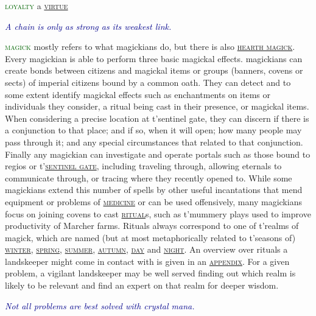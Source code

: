 \documentclass[twoside,11pt,b5paper,twocolumn]{scrbook}
\newcommand{\estcab}[1]{\textsc{\textcolor{marron}{#1}}}
\newcommand{\keyword}[1]{\textcolor{darkgreen}{#1}}
\renewcommand{\paragraph}[1]{\par\noindent\markboth{#1}{#1}\estcab{\keyword{#1}}\label{#1} }
\newcommand{\see}[1]{{\estcab{\hyperref[#1]{#1}}}}
\newcommand{\proverb}[1]{\par \textcolor{darkblue}{\itshape #1}}
\begin{document}
\paragraph{loyalty} a \see{virtue} \proverb{A chain is only as strong as its weakest link.}
\paragraph{magick} mostly refers to what magickians do, but there is also \see{hearth magick}. Every magickian is able to perform three basic magickal effects. magickians can create bonds between citizens and magickal items or groups (banners, covens or sects) of imperial citizens bound by a common oath. They can detect and to some extent identify magickal effects such as enchantments on items or individuals they consider, a ritual being cast in their presence, or magickal items. When considering a precise location at t'sentinel gate, they can discern if there is a conjunction to that place; and if so, when it will open; how many people may pass through it; and any special circumstances that related to that conjunction. Finally any magickian can investigate and operate portals such as those bound to regios or t'\see{sentinel gate}, including traveling through, allowing eternals to communicate through, or tracing where they recently opened to. While some magickians extend this number of spells by other useful incantations that mend equipment or problems of \see{medicine} or can be used offensively, many magickians focus on joining covens to cast \see{ritual}s, such as t'mummery plays used to improve productivity of Marcher farms. Rituals always correspond to one of t'realms of magick, which are named (but at most metaphorically related to t'seasons of) \see{winter}, \see{spring}, \see{summer}, \see{autumn}, \see{day} and \see{night}. An overview over rituals a landskeeper might come in contact with is given in an \see{appendix}. For a given problem, a vigilant landskeeper may be well served finding out which realm is likely to be relevant and find an expert on that realm for deeper wisdom. \proverb{Not all problems are best solved with crystal mana.}
\end{document}
